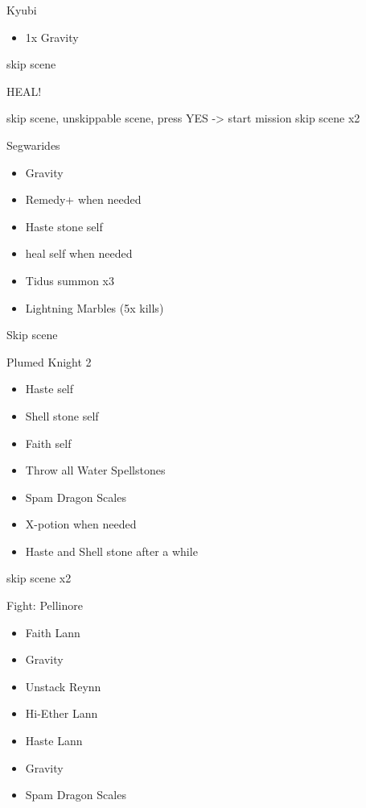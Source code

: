 \begin{battle}[]{Kyubi}
    \begin{itemize}
        \item 1x Gravity
    \end{itemize}
\end{battle}
skip scene
 
HEAL!
 
skip scene, unskippable scene, press YES
-> start mission
skip scene x2
 
\begin{battle}[]{Segwarides}
    \begin{itemize}
        \item Gravity
        \item Remedy+ when needed
        \item Haste stone self
        \item heal self when needed
        \item Tidus summon x3
        \item Lightning Marbles (5x kills)
    \end{itemize}
\end{battle}
Skip scene
 
\begin{battle}[]{Plumed Knight 2}
    \begin{itemize}
        \item Haste self
        \item Shell stone self
        \item Faith self
        \item Throw all Water Spellstones
        \item Spam Dragon Scales
        \item X-potion when needed
        \item Haste and Shell stone after a while
    \end{itemize}
\end{battle}
 
skip scene x2
 
\begin{battle}[]{Fight: Pellinore}
    \begin{itemize}
        \item Faith Lann
        \item Gravity
        \item Unstack Reynn
        \item Hi-Ether Lann
        \item Haste Lann
        \item Gravity
        \item Spam Dragon Scales
    \end{itemize}
\end{battle}
 
